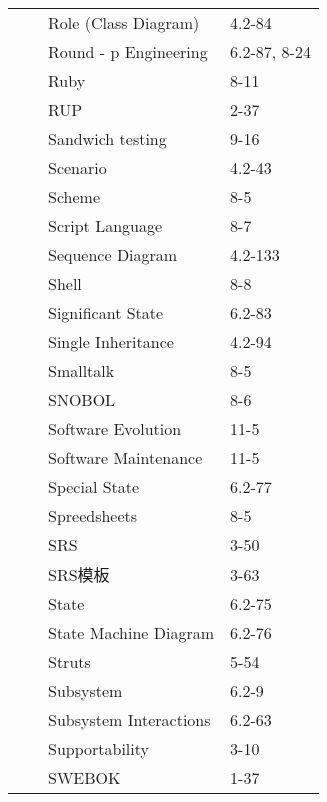 \documentclass[twocolumn]{article}
\begin{document}
\begin{tabular}{ | >{\bfseries}m{0.5em} | >{\bfseries}m{1em} | m{12em} | m{8em} |}
 &  & Role (Class Diagram) & 4.2-84\\ \cline{3-4}
 &  & Round - p Engineering & 6.2-87, 8-24\\ \cline{3-4}
 &  & Ruby & 8-11\\ \cline{3-4}
 &  & RUP & 2-37\\ \cline{2-4}
 & \multirow{23}{1em}{S \newline  \newline  \newline  \newline  \newline S \newline  \newline  \newline  \newline  \newline S \newline  \newline  \newline  \newline  \newline S \newline  \newline  \newline  \newline  \newline S} & Sandwich testing & 9-16\\ \cline{3-4}
 &  & Scenario & 4.2-43\\ \cline{3-4}
 &  & Scheme & 8-5\\ \cline{3-4}
 &  & Script Language & 8-7\\ \cline{3-4}
 &  & Sequence Diagram & 4.2-133\\ \cline{3-4}
 &  & Shell & 8-8\\ \cline{3-4}
 &  & Significant State & 6.2-83\\ \cline{3-4}
 &  & Single Inheritance & 4.2-94\\ \cline{3-4}
 &  & Smalltalk & 8-5\\ \cline{3-4}
 &  & SNOBOL & 8-6\\ \cline{3-4}
 &  & Software Evolution & 11-5\\ \cline{3-4}
 &  & Software Maintenance & 11-5\\ \cline{3-4}
 &  & Special State & 6.2-77\\ \cline{3-4}
 &  & Spreedsheets & 8-5\\ \cline{3-4}
 &  & SRS & 3-50\\ \cline{3-4}
 &  & SRS模板 & 3-63\\ \cline{3-4}
 &  & State & 6.2-75\\ \cline{3-4}
 &  & State Machine Diagram & 6.2-76\\ \cline{3-4}
 &  & Struts & 5-54\\ \cline{3-4}
 &  & Subsystem & 6.2-9\\ \cline{3-4}
 &  & Subsystem Interactions & 6.2-63\\ \cline{3-4}
 &  & Supportability & 3-10\\ \cline{3-4}
 &  & SWEBOK & 1-37\\ \cline{1-4}
\end{tabular}
\end{document}
